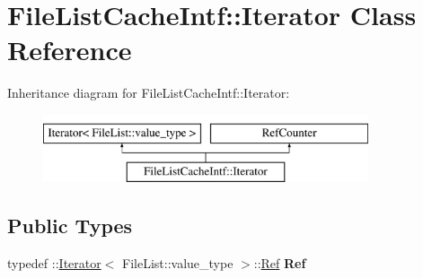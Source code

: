 \hypertarget{class_file_list_cache_intf_1_1_iterator}{
\section{FileListCacheIntf::Iterator Class Reference}
\label{class_file_list_cache_intf_1_1_iterator}
}
Inheritance diagram for FileListCacheIntf::Iterator:\begin{figure}[H]
\begin{center}
\leavevmode
\includegraphics[height=2cm]{class_file_list_cache_intf_1_1_iterator}
\end{center}
\end{figure}
\subsection*{Public Types}
\begin{DoxyCompactItemize}
\item 
\hypertarget{class_file_list_cache_intf_1_1_iterator_ab96c83b173b507a638982068881a88cc}{
typedef ::\hyperlink{class_file_list_cache_intf_1_1_iterator}{Iterator}$<$ FileList::value\_\-type $>$::\hyperlink{class_ref}{Ref} {\bfseries Ref}}
\label{class_file_list_cache_intf_1_1_iterator_ab96c83b173b507a638982068881a88cc}

\end{DoxyCompactItemize}
